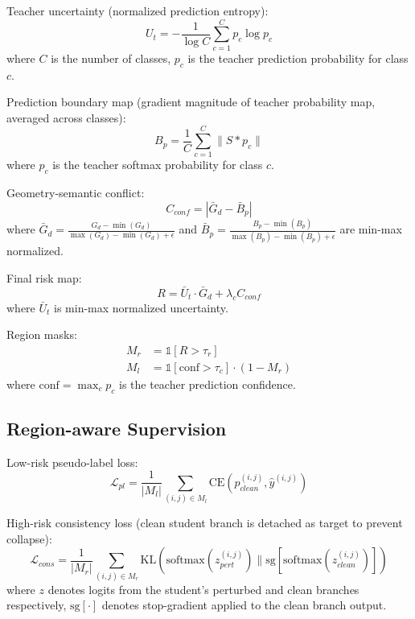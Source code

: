 \documentclass[conference]{IEEEtran}
\begin{document}
Teacher uncertainty (normalized prediction entropy):
\begin{equation}
U_t = -\frac{1}{\log C} \sum_{c=1}^{C} p_c \log p_c
\end{equation}
where $C$ is the number of classes, $p_c$ is the teacher prediction probability for class $c$.

Prediction boundary map (gradient magnitude of teacher probability map, averaged across classes):
\begin{equation}
B_p = \frac{1}{C} \sum_{c=1}^{C} \|S * p_c\|
\end{equation}
where $p_c$ is the teacher softmax probability for class $c$.

Geometry-semantic conflict:
\begin{equation}
C_{conf} = |\bar{G}_d - \bar{B}_p|
\end{equation}
where $\bar{G}_d = \frac{G_d - \min(G_d)}{\max(G_d) - \min(G_d) + \epsilon}$ and $\bar{B}_p = \frac{B_p - \min(B_p)}{\max(B_p) - \min(B_p) + \epsilon}$ are min-max normalized.

Final risk map:
\begin{equation}
R = \bar{U}_t \cdot \bar{G}_d + \lambda_c C_{conf}
\end{equation}
where $\bar{U}_t$ is min-max normalized uncertainty.

Region masks:
\begin{align}
M_r &= \mathbb{1}[R > \tau_r] \\
M_l &= \mathbb{1}[\text{conf} > \tau_c] \cdot (1 - M_r)
\end{align}
where $\text{conf} = \max_c p_c$ is the teacher prediction confidence.

\subsection{Region-aware Supervision}

Low-risk pseudo-label loss:
\begin{equation}
\mathcal{L}_{pl} = \frac{1}{|M_l|} \sum_{(i,j) \in M_l} \text{CE}(p_{clean}^{(i,j)}, \hat{y}^{(i,j)})
\end{equation}

High-risk consistency loss (clean student branch is detached as target to prevent collapse):
\begin{equation}
\mathcal{L}_{cons} = \frac{1}{|M_r|} \sum_{(i,j) \in M_r} \text{KL}(\text{softmax}(z_{pert}^{(i,j)}) \| \text{sg}[\text{softmax}(z_{clean}^{(i,j)})])
\end{equation}
where $z$ denotes logits from the student's perturbed and clean branches respectively, $\text{sg}[\cdot]$ denotes stop-gradient applied to the clean branch output.
\end{document}
